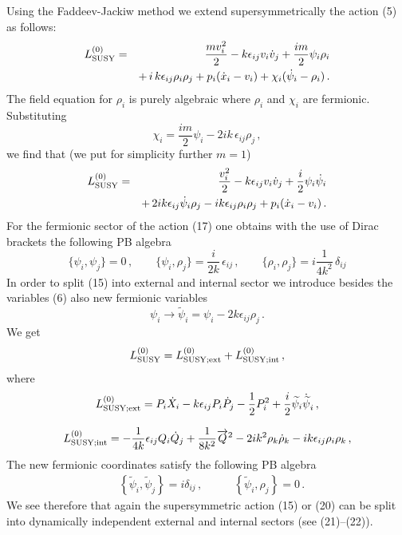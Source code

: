 \documentclass[a4paper,12pt]{article}
\begin{document}
  Using
   the 
  Faddeev-Jackiw method we extend supersymmetrically the
action (5) as follows:
\begin{eqnarray}\label{pary2.15}
L^{(0)}_{\rm SUSY} &= &
 \frac{m v^2_i}{2}
 - k \epsilon_{ij}v_i \dot{v}_j
+ \frac{im}{2} \psi_i \rho_i
 \cr  &&+ \, i\, k \epsilon_{ij} \rho_i
\rho_j
 + p_i (\dot{x}_i - v_i ) + \chi_i( \dot{\psi}_i - \rho_i)\, .
\end{eqnarray}
The field equation for $\rho_i$ is purely algebraic
    where $\rho_i$ and $\chi_i$ are fermionic.
 Substituting
\begin{equation}\label{pary2.16}
  \chi_i = \frac{im}{2} \psi_i - 2ik\, \epsilon_{ij} \rho_j\, ,
\end{equation}
 we find that (we put for simplicity further $m=1$)
\begin{eqnarray}\label{pary2.17}
L^{(0)}_{\rm SUSY} &= &
 \frac{ v^2_i}{2}
 - k \epsilon_{ij}v_i \dot{v}_j
+ \frac{i}{2} \psi_i \dot{\psi}_i \cr  &&+ \,
2i k \epsilon_{ij} \dot{\psi}_i {\rho}_j
 - i k \epsilon_{ij} \rho_i {\rho}_j
+p_i
 ( \dot{x}_i - v_i)\, .
\end{eqnarray}
 For 
 the fermionic
  sector of the action (17) one obtains
    with the use of Dirac brackets
    the following  PB algebra 
  \begin{equation}\label{pary2.18}
  \{ \psi_i , \psi_j \} = 0 \, , \qquad
   \{ \psi_i, \rho_j \} = \frac{i}{2k}\, \epsilon_{ij} \, ,
   \qquad
   \{\rho_i, \rho_j \} = i \frac{1}{4k^2} \, \delta_{ij}
    \end{equation}
In order to split (15)  into external and internal sector we introduce
 besides the variables (6) also new fermionic variables
\begin{equation}\label{pary2.19}
  \psi_i \longrightarrow\widetilde{\psi}_i = \psi_i 
  -   2k\epsilon_{ij}
  \rho_j \, .
\end{equation}
  We  get
\begin{equation}\label{pary2.20}
L^{(0)}_{\rm SUSY}  = L^{(0)}_{\rm SUSY; ext} + L^{(0)}_{\rm
SUSY;int}\, ,
\end{equation}
where
\begin{equation}\label{pary2.21}
  L^{(0)}_{\rm SUSY;ext} = P_i \dot{X}_i - k
   \epsilon_{ij}P_i\dot{P}_j
 - \frac{1}{2}  P^2_i
   + \frac{i}{2} \widetilde{\psi}_i
  \dot{\widetilde{\psi}}_i \, ,
\end{equation}
                                      

\begin{equation}\label{pary2.22}
 L^{(0)}_{\rm SUSY;int} = - \frac{1}{4k}
 \epsilon_{ij}Q_i\dot{Q}_j
 + \frac{1}{8k^2} \overrightarrow{Q}^2 - 2ik^2 \rho_k \dot{\rho}_k
  - ik \epsilon_{ij}\rho_i \rho_k \, ,
\end{equation}
 The new fermionic coordinates satisfy the following PB algebra
\begin{eqnarray}\label{pary2.23}
&  \left\{ \widetilde{\psi}_i, \widetilde{\psi}_j \right\} =
  i\delta_{ij}\, ,
\qquad
  &  \left\{ \widetilde{\psi}_i, {\rho}_j \right\} =
  0 \, .
\end{eqnarray}
We see therefore that again the supersymmetric action (15) or
(20) can be split into dynamically independent external and
internal sectors (see (21)--(22)).
\end{document}
